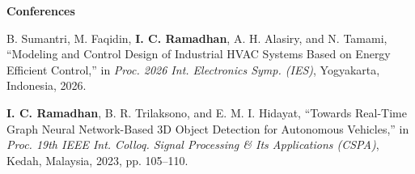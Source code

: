 \vspace{4pt}
\noindent\textbf{Conferences}
\begin{enumerate}[label={[C\arabic*]}, leftmargin=2.8em]
  \item B. Sumantri, M. Faqidin, \textbf{I. C. Ramadhan}, A. H. Alasiry, and N. Tamami,
        ``Modeling and Control Design of Industrial HVAC Systems Based on Energy
        Efficient Control,'' in \textit{Proc. 2026 Int. Electronics Symp. (IES)},
        Yogyakarta, Indonesia, 2026.

  \item \textbf{I. C. Ramadhan}, B. R. Trilaksono, and E. M. I. Hidayat,
        ``Towards Real-Time Graph Neural Network-Based 3D Object Detection
        for Autonomous Vehicles,''
        in \textit{Proc. 19th IEEE Int. Colloq. Signal Processing \& Its
        Applications (CSPA)}, Kedah, Malaysia, 2023, pp. 105--110.
\end{enumerate}
